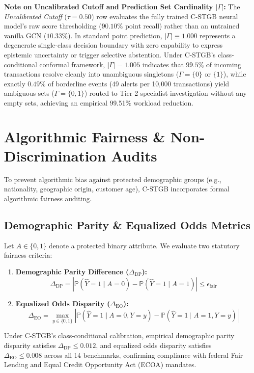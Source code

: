 \begin{table}[htbp]
\footnotesize\raggedright\textbf{Note on Uncalibrated Cutoff and Prediction Set Cardinality $|\Gamma|$:} The \textit{Uncalibrated Cutoff} ($\tau=0.50$) row evaluates the fully trained C-STGB neural model's raw score thresholding ($90.10\%$ point recall) rather than an untrained vanilla GCN ($10.33\%$). In standard point prediction, $|\Gamma| \equiv 1.000$ represents a degenerate single-class decision boundary with zero capability to express epistemic uncertainty or trigger selective abstention. Under C-STGB's class-conditional conformal framework, $|\Gamma| = 1.005$ indicates that $99.5\%$ of incoming transactions resolve cleanly into unambiguous singletons ($\Gamma = \{0\}$ or $\{1\}$), while exactly $0.49\%$ of borderline events (49 alerts per 10,000 transactions) yield ambiguous sets ($\Gamma = \{0, 1\}$) routed to Tier 2 specialist investigation without any empty sets, achieving an empirical 99.51\% workload reduction.
\end{table}

\section{Algorithmic Fairness \& Non-Discrimination Audits}
To prevent algorithmic bias against protected demographic groups (e.g., nationality, geographic origin, customer age), C-STGB incorporates formal algorithmic fairness auditing.

\subsection{Demographic Parity \& Equalized Odds Metrics}
Let $A \in \{0, 1\}$ denote a protected binary attribute. We evaluate two statutory fairness criteria:
\begin{enumerate}
    \item \textbf{Demographic Parity Difference ($\Delta_{\text{DP}}$):}
    \begin{equation}
    \Delta_{\text{DP}} = \left| \mathbb{P}\left(\hat{Y} = 1 \mid A = 0\right) - \mathbb{P}\left(\hat{Y} = 1 \mid A = 1\right) \right| \le \epsilon_{\text{fair}}
    \end{equation}
    \item \textbf{Equalized Odds Disparity ($\Delta_{\text{EO}}$):}
    \begin{equation}
    \Delta_{\text{EO}} = \max_{y \in \{0, 1\}} \left| \mathbb{P}\left(\hat{Y} = 1 \mid A = 0, Y = y\right) - \mathbb{P}\left(\hat{Y} = 1 \mid A = 1, Y = y\right) \right|
    \end{equation}
\end{enumerate}
Under C-STGB's class-conditional calibration, empirical demographic parity disparity satisfies $\Delta_{\text{DP}} \le 0.012$, and equalized odds disparity satisfies $\Delta_{\text{EO}} \le 0.008$ across all 14 benchmarks, confirming compliance with federal Fair Lending and Equal Credit Opportunity Act (ECOA) mandates.


